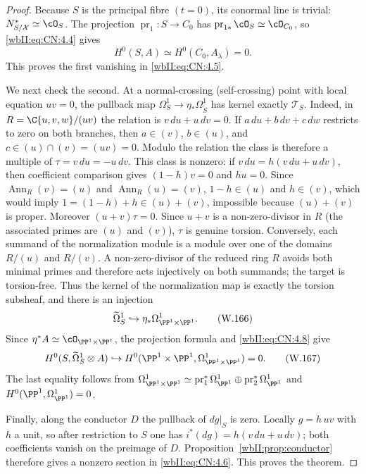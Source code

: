 \begin{proof}
Because $S$ is the principal fibre $(t=0)$, its conormal line is trivial:
\(N^*_{S/\mathcal X}\simeq\cO_S\).  The projection
\(\operatorname{pr}_1:S\to C_0\) has
\(\operatorname{pr}_{1*}\cO_S\simeq\cO_{C_0}\), so \eqref{wbII:eq:CN:4.4} gives
\[
 H^0(S,A)\simeq H^0(C_0,A_\lambda)=0.
 \tag{W.165}\label{wbII:eq:CN:4.7}
\]
This proves the first vanishing in \eqref{wbII:eq:CN:4.5}.

We next check the second.  At a normal-crossing (self-crossing) point with local equation
\(uv=0\), the pullback map
\(\Omega^1_S\to\eta_*\Omega^1_{\widetilde S}\) has kernel exactly
\(\mathscr T_S\).  Indeed, in
\(R=\C\{u,v,w\}/(uv)\) the relation is
\(v\,du+u\,dv=0\).  If
\(a\,du+b\,dv+c\,dw\) restricts to zero on both branches, then
\(a\in(v)\), \(b\in(u)\), and
\(c\in(u)\cap(v)=(uv)=0\).  Modulo the relation the class is therefore a
multiple of $\tau=v\,du=-u\,dv$.  This class is nonzero: if
\(v\,du=h(v\,du+u\,dv)\), then coefficient comparison gives
  \((1-h)v=0\) and $hu=0$.  Since
\(\operatorname{Ann}_R(v)=(u)\) and \(\operatorname{Ann}_R(u)=(v)\),
\(1-h\in(u)\) and \(h\in(v)\), which would imply
\(1=(1-h)+h\in(u)+(v)\), impossible because $(u)+(v)$ is proper.
Moreover $(u+v)\tau=0$.  Since $u+v$ is a non-zero-divisor in
$R$ (the associated primes are $(u)$ and $(v)$), $\tau$ is genuine
torsion.
Conversely, each summand of the normalization module is a module over one of
the domains $R/(u)$ and $R/(v)$.  A non-zero-divisor of the reduced ring $R$
avoids both minimal primes and therefore acts injectively on both summands;
the target is torsion-free.  Thus the kernel of the normalization map is
exactly the torsion subsheaf, and there is an injection
\[
 \widetilde\Omega^1_S\hookrightarrow\eta_*\Omega^1_{\PP^1\times\PP^1}.
 \tag{W.166}\label{wbII:eq:CN:4.8}
\]
Since $\eta^*A\simeq\cO_{\PP^1\times\PP^1}$, the projection formula and \eqref{wbII:eq:CN:4.8}
give
\[
 H^0(S,\widetilde\Omega^1_S\otimes A)
 \hookrightarrow
 H^0(\PP^1\times\PP^1,\Omega^1_{\PP^1\times\PP^1})=0.
 \tag{W.167}\label{wbII:eq:CN:4.9}
\]
The last equality follows from
\(\Omega^1_{\PP^1\times\PP^1}\simeq
\operatorname{pr}_1^*\Omega^1_{\PP^1}\oplus
\operatorname{pr}_2^*\Omega^1_{\PP^1}\) and
\(H^0(\PP^1,\Omega^1_{\PP^1})=0\).

Finally, along the conductor $D$ the pullback of $dg|_S$ is zero.  Locally
$g=h\,uv$ with $h$ a unit, so after restriction to $S$ one has
$i^*(dg)=h(v\,du+u\,dv)$; both coefficients vanish on the preimage of $D$.
Proposition~\ref{wbII:prop:conductor}
therefore gives a nonzero section in \eqref{wbII:eq:CN:4.6}.  This proves the theorem.
\end{proof}

